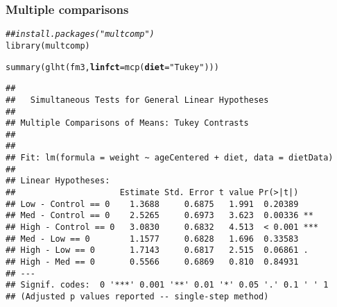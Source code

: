 \documentclass[color=usenames,dvipsnames]{beamer}\usepackage[]{graphicx}\usepackage[]{color}
\makeatletter
\newcommand{\hlstr}[1]{\textcolor[rgb]{0.749,0.012,0.012}{#1}}%
\newcommand{\hlcom}[1]{\textcolor[rgb]{0.514,0.506,0.514}{\textit{#1}}}%
\newcommand{\hlstd}[1]{\textcolor[rgb]{0,0,0}{#1}}%
\newcommand{\hlkwc}[1]{\textcolor[rgb]{0,0,0}{\textbf{#1}}}%
\newcommand{\hlkwd}[1]{\textcolor[rgb]{0.004,0.004,0.506}{#1}}%
\newenvironment{kframe}{%
 \def\at@end@of@kframe{}%
 \ifinner\ifhmode%
  \def\at@end@of@kframe{\end{minipage}}%
  \begin{minipage}{\columnwidth}%
 \fi\fi%
 \def\FrameCommand##1{\hskip\@totalleftmargin \hskip-\fboxsep
 \colorbox{shadecolor}{##1}\hskip-\fboxsep
     \hskip-\linewidth \hskip-\@totalleftmargin \hskip\columnwidth}%
 \MakeFramed {\advance\hsize-\width
   \@totalleftmargin\z@ \linewidth\hsize
   \@setminipage}}%
 {\par\unskip\endMakeFramed%
 \at@end@of@kframe}
\newenvironment{knitrout}{}{} %
\makeatother
\begin{document}
\begin{frame}[fragile]
  \frametitle{Multiple comparisons}
\scriptsize
\begin{knitrout}
\color{fgcolor}\begin{kframe}
\begin{alltt}
\hlcom{## install.packages("multcomp")}
\hlkwd{library}\hlstd{(multcomp)}
\end{alltt}


{\ttfamily\noindent\itshape\color{messagecolor}{\#\# Loading required package: mvtnorm}}

{\ttfamily\noindent\itshape\color{messagecolor}{\#\# Loading required package: survival}}

{\ttfamily\noindent\itshape\color{messagecolor}{\#\# Loading required package: TH.data}}

{\ttfamily\noindent\itshape\color{messagecolor}{\#\# Loading required package: MASS}}

{\ttfamily\noindent\itshape\color{messagecolor}{\#\# \\\#\# Attaching package: 'TH.data'}}

{\ttfamily\noindent\itshape\color{messagecolor}{\#\# The following object is masked from 'package:MASS':\\\#\# \\\#\#\ \ \ \  geyser}}\begin{alltt}
\hlkwd{summary}\hlstd{(}\hlkwd{glht}\hlstd{(fm3,} \hlkwc{linfct}\hlstd{=}\hlkwd{mcp}\hlstd{(}\hlkwc{diet}\hlstd{=}\hlstr{"Tukey"}\hlstd{)))}
\end{alltt}
\begin{verbatim}
## 
## 	 Simultaneous Tests for General Linear Hypotheses
## 
## Multiple Comparisons of Means: Tukey Contrasts
## 
## 
## Fit: lm(formula = weight ~ ageCentered + diet, data = dietData)
## 
## Linear Hypotheses:
##                     Estimate Std. Error t value Pr(>|t|)    
## Low - Control == 0    1.3688     0.6875   1.991  0.20389    
## Med - Control == 0    2.5265     0.6973   3.623  0.00336 ** 
## High - Control == 0   3.0830     0.6832   4.513  < 0.001 ***
## Med - Low == 0        1.1577     0.6828   1.696  0.33583    
## High - Low == 0       1.7143     0.6817   2.515  0.06861 .  
## High - Med == 0       0.5566     0.6869   0.810  0.84931    
## ---
## Signif. codes:  0 '***' 0.001 '**' 0.01 '*' 0.05 '.' 0.1 ' ' 1
## (Adjusted p values reported -- single-step method)
\end{verbatim}
\end{kframe}
\end{knitrout}
\end{frame}
\end{document}
